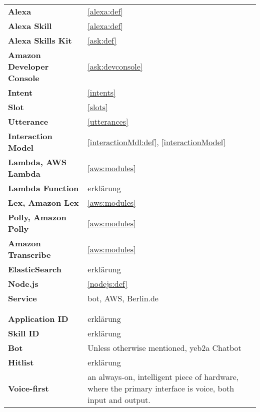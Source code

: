 \begin{flushleft}
\begin{tabular}{ll}

\textbf{Alexa}				&		\ref{alexa:def}\\
\textbf{Alexa Skill}		&		\ref{alexa:def}\\
\textbf{Alexa Skills Kit}	&		\ref{ask:def}\\
\textbf{Amazon Developer Console}&	\ref{ask:devconsole}\\

\textbf{Intent}				&		\ref{intents}\\
\textbf{Slot}				&		\ref{slots}\\
\textbf{Utterance}			&		\ref{utterances}\\
\textbf{Interaction Model}	&		\ref{interactionMdl:def}, \ref{interactionModel}\\


\textbf{Lambda, AWS Lambda}	&		\ref{aws:modules}\\
\textbf{Lambda Function}	&		erklärung\\
\textbf{Lex, Amazon Lex}	&		\ref{aws:modules}\\
\textbf{Polly, Amazon Polly}&		\ref{aws:modules}\\
\textbf{Amazon Transcribe}	&		\ref{aws:modules}\\
\textbf{ElasticSearch}		&		erklärung\\

\textbf{Node.js}			&		\ref{nodejs:def}\\
\textbf{Service}			&		bot, AWS, Berlin.de\\

\\

\\
\textbf{Application ID}		&	erklärung\\
\textbf{Skill ID}			&	erklärung\\
\textbf{Bot}				&	Unless otherwise mentioned, yeb2a Chatbot\\
\textbf{Hitlist}			&	erklärung\\
\textbf{Voice-first}		& an always-on, intelligent piece of hardware, where the primary interface is voice, both input and output.\\



\end{tabular}
\end{flushleft}
